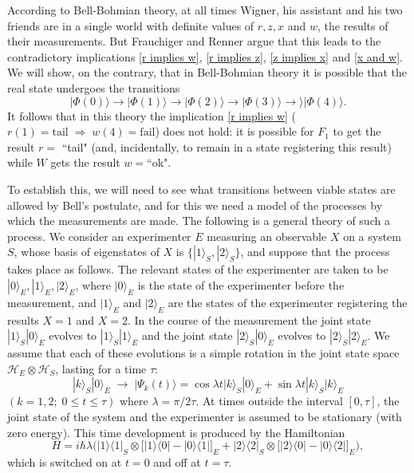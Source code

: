 \documentclass[12pt,reqno]{article}
\newcommand{\tail}{\text{tail}}
\newcommand{\fail}{\text{fail}}
\renewcommand{\(}{\left(}
\renewcommand{\)}{\right)}
\renewcommand{\.}{\centerdot}
\newcommand{\1}{\mathbf{1}}
\newcommand{\ox}{\otimes}
\newcommand{\<}{\langle}
\renewcommand{\>}{\rangle}
\renewcommand{\H}{\mathcal{H}}
\theoremstyle{definition}
\theoremstyle{remark}
\numberwithin{equation}{section}
\begin{document}
According to Bell-Bohmian theory, at all times Wigner, his assistant and his two friends are in a single world with definite values of $r, z, x$ and $w$, the results of their measurements. But Frauchiger and Renner argue that this leads to the contradictory implications \eqref{r implies w}, \eqref{r implies z}, \eqref{z implies x} and \eqref{x and w}. We will show, on the contrary, that in Bell-Bohmian theory it is possible that the real state undergoes the transitions
\[
|\Phi(0)\> \longrightarrow |\Phi(1)\> \longrightarrow |\Phi(2)\> \longrightarrow |\Phi(3)\> \longrightarrow\> |\Phi(4)\>.
\]
It follows that in this theory the implication \eqref{r implies w} ($r(1) = \tail\; \Longrightarrow \; w(4) = \fail$) does not hold: it is possible for $F_1$ to get the result $r = $ ``tail" (and, incidentally, to remain in a state registering this result) while $W$ gets the result $w = $``ok".
 
To establish this, we will need to see what transitions between viable states are allowed by Bell's postulate, and for this we need a model of the processes by which the measurements are made. The following is a general theory of such a process. We consider an experimenter $E$ measuring an observable $X$ on a system $S$, whose basis of eigenstates of $X$ is $\{|1\>_S,|2\>_S\}$, and suppose that the process takes place as follows. The relevant states of the experimenter are taken to be $|0\>_E,|1\>_E,|2\>_E$, where $|0\>_E$ is the state of the experimenter before the measurement, and $|1\>_E$ and $|2\>_E$ are the states of the experimenter registering the results $X = 1$ and $X = 2$. In the course of the measurement the joint state $|1\>_S|0\>_E$ evolves to $|1\>_S|1\>_E$ and the joint state $|2\>_S|0\>_E$ evolves to $|2\>_S|2\>_E$. We assume that each of these evolutions is a simple rotation in the joint state space $\H_E\ox\H_S$, lasting for a time $\tau$:
\[
|k\>_S|0\>_E \; \longrightarrow \; |\Psi_k(t)\> = \cos\lambda t|k\>_S|0\>_E + \sin\lambda t|k\>_S|k\>_E
\]
$(k = 1,2; \; 0\le t\le \tau)$ where $\lambda = \pi/2\tau$. At times outside the interval $[0,\tau]$, the joint state of the system and the experimenter is assumed to be stationary (with zero energy). This time development is produced by the Hamiltonian
\[
H = i\hbar\lambda\bigg(|1\>\<1|_S\ox\big[|1\>\<0| - |0\>\<1|\big]_E + 
|2\>\<2|_S\ox\big[|2\>\<0| - |0\>\<2|\big]_E\bigg),
\]
which is switched on at $t = 0$ and off at $t = \tau$.
\end{document}
